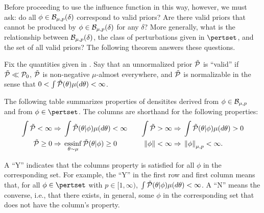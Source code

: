 Before proceeding to use the influence function in this way, however, we must
ask: do all $\phi \in \mathcal{B}_{\mu,p}(\delta)$ correspond to valid priors?  Are
there valid priors that cannot be produced by $\phi \in \mathcal{B}_{\mu,p}(\delta)$
for any $\delta$?  More generally, what is the relationship between
$\mathcal{B}_{\mu,p}(\delta)$, the class of perturbations given in $\pertset$, and the
set of all valid priors?  The following theorem answers these questions.


\begin{thm}
%
Fix the quantities given in .  Say that an unnormalized
prior $\tilde{\mathcal{P}}$ is ``valid'' if $\tilde{\mathcal{P}} \ll \mathcal{P}_{0}$, $\tilde{\mathcal{P}}$ is non-negative
$\mu$-almost everywhere, and $\tilde{\mathcal{P}}$ is normalizable in the sense that $0 < \int
\tilde{\mathcal{P}}(\theta) \mu(d\theta) < \infty$.

The following table summarizes properties of densitites derived from $\phi \in
\mathcal{B}_{\mu,p}$ and from $\phi \in \pertset$.  The columns are shorthand for the
following properties:
%
\begin{align*}
%
\int \ptil < \infty \Rightarrow{}&
    \int \ptil(\theta \vert \phi) \mu(d\theta) < \infty   &\quad
%
\int \ptil > \infty \Rightarrow{}&
    \int \ptil(\theta \vert \phi) \mu(d\theta) > 0\\
%
\ptil \ge 0 \Rightarrow{}&
    \essinf_{\theta \sim \mu} \ptil(\theta \vert \phi) \ge 0  &\quad
\norm{\phi} < \infty \Rightarrow{}& \norm{\phi}_{\mu,p} < \infty.
%
\end{align*}

A ``Y'' indicates that the columns property is satisfied for all $\phi$ in the
corresponding set.  For example, the ``Y'' in the first row and first column
means that, for all $\phi \in \pertset$ with $p \in [1, \infty)$, $\int
\tilde{\mathcal{P}}(\theta \vert \phi) \mu(d\theta) < \infty$.  A ``N'' means the converse,
i.e., that there exists, in general, some $\phi$ in the corresponding set that
does not have the column's property.


\end{thm}
